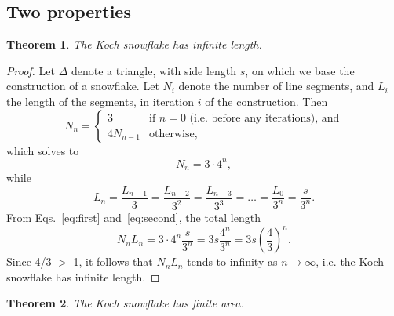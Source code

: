 \documentclass[12pt, a4paper]{article}
\newcommand{\uberfrac}[1]{
	= \frac {L_{n - #1}} {3^#1}
}
\newtheorem{theorem}{Theorem}
\begin{document}
\subsection{Two properties}
\begin{theorem}
	The Koch snowflake has infinite length.
\end{theorem}
\begin{proof}
Let $\Delta$ denote a triangle, with side length $s$, on which
we base the construction of a snowflake. Let $N_i$ denote the number of line
segments, and $L_i$ the length of the segments, in iteration $i$ of the 
construction. Then%
$$%
	N_n = 
	\begin{cases}
		3 &\text{if } n = 0 \text{ (i.e. before any iterations), and} \\
		4N_{n-1} &\text{otherwise,}
	\end{cases}
$$%
which solves to
\begin{equation} \label{eq:first}
	N_n = 3 \cdot 4^n,
\end{equation}
while
\begin{equation}\label{eq:second}
	L_n = \frac {L_{n-1}} {3} \uberfrac{2} \uberfrac{3} = \ldots = 
		\frac{L_0} {3^n} = \frac s {3^n}.
\end{equation}
From Eqs.~\ref{eq:first} and~\ref{eq:second}, the total length
$$
	N_nL_n = 3 \cdot 4^n \frac s {3^n} = 3s \frac {4^n} {3^n} = 3s \left (
		\frac 4 3
	\right )^n.
$$
Since 4/3 $>$ 1, it follows that $N_nL_n$ tends to infinity as
$n \to \infty$, i.e. the Koch snowflake has infinite length. 
\end{proof}
\begin{theorem}
	The Koch snowflake has finite area.
\end{theorem}
\end{document}
